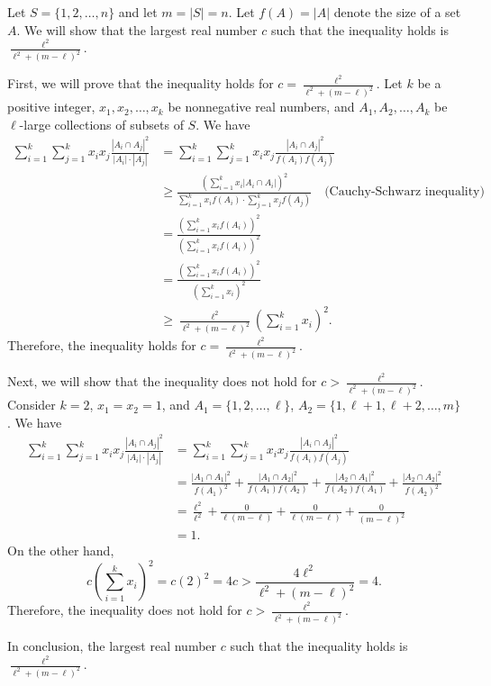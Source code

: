 Let $S = \{1, 2, \dots, n\}$ and let $m = |S| = n$. Let $f(A) = |A|$ denote the size of a set $A$. We will show that the largest real number $c$ such that the inequality holds is $\frac{\ell^2}{\ell^2 + (m-\ell)^2}$.

First, we will prove that the inequality holds for $c = \frac{\ell^2}{\ell^2 + (m-\ell)^2}$. Let $k$ be a positive integer, $x_1, x_2, \dots, x_k$ be nonnegative real numbers, and $A_1, A_2, \dots, A_k$ be $\ell$-large collections of subsets of $S$. We have
\begin{align*}
\sum_{i=1}^k\sum_{j=1}^k x_ix_j \frac{|A_i\cap A_j|^2}{|A_i|\cdot|A_j|} &= \sum_{i=1}^k\sum_{j=1}^k x_ix_j \frac{|A_i\cap A_j|^2}{f(A_i)f(A_j)} \\
&\ge \frac{\left(\sum_{i=1}^k x_i|A_i\cap A_i|\right)^2}{\sum_{i=1}^k x_if(A_i)\cdot \sum_{j=1}^k x_jf(A_j)} \quad \text{(Cauchy-Schwarz inequality)} \\
&= \frac{\left(\sum_{i=1}^k x_if(A_i)\right)^2}{\left(\sum_{i=1}^k x_if(A_i)\right)^2} \\
&= \frac{\left(\sum_{i=1}^k x_if(A_i)\right)^2}{\left(\sum_{i=1}^k x_i\right)^2} \\
&\ge \frac{\ell^2}{\ell^2 + (m-\ell)^2} \left(\sum_{i=1}^k x_i\right)^2.
\end{align*}
Therefore, the inequality holds for $c = \frac{\ell^2}{\ell^2 + (m-\ell)^2}$.

Next, we will show that the inequality does not hold for $c > \frac{\ell^2}{\ell^2 + (m-\ell)^2}$. Consider $k = 2$, $x_1 = x_2 = 1$, and $A_1 = \{1, 2, \dots, \ell\}$, $A_2 = \{1, \ell+1, \ell+2, \dots, m\}$. We have
\begin{align*}
\sum_{i=1}^k\sum_{j=1}^k x_ix_j \frac{|A_i\cap A_j|^2}{|A_i|\cdot|A_j|} &= \sum_{i=1}^k\sum_{j=1}^k x_ix_j \frac{|A_i\cap A_j|^2}{f(A_i)f(A_j)} \\
&= \frac{|A_1\cap A_1|^2}{f(A_1)^2} + \frac{|A_1\cap A_2|^2}{f(A_1)f(A_2)} + \frac{|A_2\cap A_1|^2}{f(A_2)f(A_1)} + \frac{|A_2\cap A_2|^2}{f(A_2)^2} \\
&= \frac{\ell^2}{\ell^2} + \frac{0}{\ell(m-\ell)} + \frac{0}{\ell(m-\ell)} + \frac{0}{(m-\ell)^2} \\
&= 1.
\end{align*}
On the other hand,
\[
c\left(\sum_{i=1}^k x_i\right)^2 = c(2)^2 = 4c > \frac{4\ell^2}{\ell^2 + (m-\ell)^2} = 4.
\]
Therefore, the inequality does not hold for $c > \frac{\ell^2}{\ell^2 + (m-\ell)^2}$.

In conclusion, the largest real number $c$ such that the inequality holds is $\frac{\ell^2}{\ell^2 + (m-\ell)^2}$.
